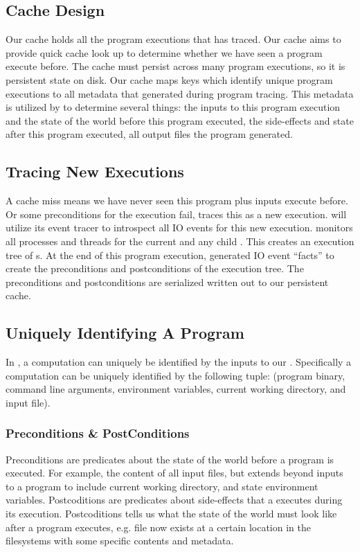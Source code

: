 \subsection{Cache Design}
Our cache holds all the program executions that \pc has traced. Our cache aims to provide quick cache look up to determine whether we have seen a program execute before. The cache must persist across many program executions, so it is persistent state on disk. Our cache maps keys which identify unique program executions to all metadata that \pc generated during program tracing. This metadata is utilized by \pc to determine several things: the inputs to this program execution and the state of the world before this program executed, the side-effects and state after this program executed, all output files the program generated. 

\subsection{Tracing New Executions}
A cache miss means we have never seen this program plus inputs execute before. Or some preconditions for the execution fail, \pc traces this as a new execution. \pc will utilize its event tracer to introspect all IO events for this new execution. \pc monitors all processes and threads for the current \cacheunit and any child \cacheunit. This creates an execution tree of \cacheunit{}s. At the end of this program execution, \pc generated IO event “facts” to create the preconditions and postconditions of the execution tree. The preconditions and postconditions are serialized written out to our persistent cache.

\subsection{Uniquely Identifying A Program} \label{sec:unique-program}
In \pc, a computation can uniquely be identified by the inputs to our \cacheunit. Specifically a computation can be uniquely identified by the following tuple: (program binary, command line arguments, environment variables, current working directory, and input file).

\subsubsection{Preconditions \& PostConditions} \label{sec:conditions}
Preconditions are predicates about the state of the world before a program is executed. For example, the content of all input files, but extends beyond inputs to a program to include current working directory, and state environment variables. Postcoditions are predicates about side-effects that a \cacheunit executes during its execution. Postcoditions tells us what the state of the world must look like after a program executes, e.g. file  now exists at a certain location in the filesystems with some specific contents and metadata.


